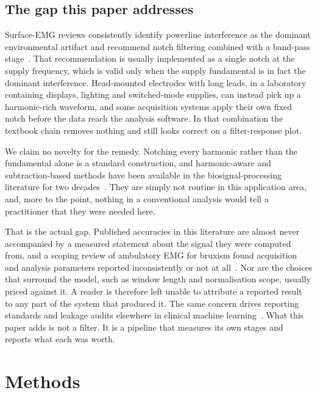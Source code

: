 \documentclass[pdflatex,sn-nature,iicol]{sn-jnl}
\begin{document}
\subsection{The gap this paper addresses}
\label{sec:gap}

Surface-EMG reviews consistently identify powerline interference as the dominant environmental artifact and recommend notch filtering combined with a band-pass stage~\cite{chowdhury2013surface,raez2006techniques}. That recommendation is usually implemented as a single notch at the supply frequency, which is valid only when the supply fundamental is in fact the dominant interference. Head-mounted electrodes with long leads, in a laboratory containing displays, lighting and switched-mode supplies, can instead pick up a harmonic-rich waveform, and some acquisition systems apply their own fixed notch before the data reach the analysis software. In that combination the textbook chain removes nothing and still looks correct on a filter-response plot.

We claim no novelty for the remedy. Notching every harmonic rather than the fundamental alone is a standard construction, and harmonic-aware and subtraction-based methods have been available in the biosignal-processing literature for two decades~\cite{mewett2004reducing,levkov2005removal,keshtkaran2014fast,sornmo2005bioelectrical}. They are simply not routine in this application area, and, more to the point, nothing in a conventional analysis would tell a practitioner that they were needed here.

That is the actual gap. Published accuracies in this literature are almost never accompanied by a measured statement about the signal they were computed from, and a scoping review of ambulatory EMG for bruxism found acquisition and analysis parameters reported inconsistently or not at all~\cite{thymi2021signal}. Nor are the choices that surround the model, such as window length and normalisation scope, usually priced against it. A reader is therefore left unable to attribute a reported result to any part of the system that produced it. The same concern drives reporting standards and leakage audits elsewhere in clinical machine learning~\cite{collins2024tripod,kapoor2023leakage,varoquaux2022machine,pineau2021improving}. What this paper adds is not a filter. It is a pipeline that measures its own stages and reports what each was worth.

\section{Methods}
\end{document}
